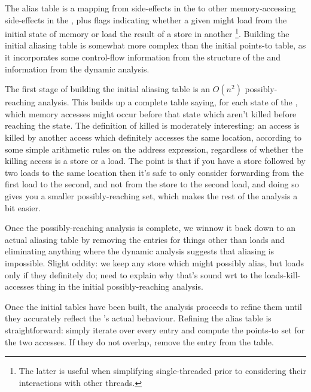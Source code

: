 The alias table is a mapping from  side-effects in the
{\StateMachine} to other memory-accessing side-effects in the
{\StateMachine}, plus flags indicating whether a given might load from
the initial state of memory or load the result of a store in another
{\StateMachine}\footnote{The latter is useful when simplifying
  single-threaded {\StateMachines} prior to considering their
  interactions with other threads.}.  Building the initial aliasing
table is somewhat more complex than the initial points-to table, as it
incorporates some control-flow information from the structure of the
{\StateMachine} and information from the dynamic analysis.

The first stage of building the initial aliasing table is an $O(n^2)$
possibly-reaching analysis.  This builds up a complete table saying,
for each state of the {\StateMachine}, which memory accesses might
occur before that state which aren't killed before reaching the state.
The definition of killed is moderately interesting: an access is
killed by another access which definitely accesses the same location,
according to some simple arithmetic rules on the address expression,
regardless of whether the killing access is a store or a load.  The
point is that if you have a store followed by two loads to the same
location then it's safe to only consider forwarding from the first
load to the second, and not from the store to the second load, and
doing so gives you a smaller possibly-reaching set, which makes the
rest of the analysis a bit easier.

Once the possibly-reaching analysis is complete, we winnow it back
down to an actual aliasing table by removing the entries for things
other than loads and eliminating anything where the dynamic analysis
suggests that aliasing is impossible.    Slight oddity: we
keep any store which might possibly alias, but loads only if they
definitely do; need to explain why that's sound wrt to the
loads-kill-accesses thing in the initial possibly-reaching analysis.


Once the initial tables have been built, the analysis proceeds to
refine them until they accurately reflect the {\StateMachine}'s actual
behaviour.  Refining the alias table is straightforward: simply
iterate over every entry and compute the points-to set for the two
accesses.  If they do not overlap, remove the entry from the table.

